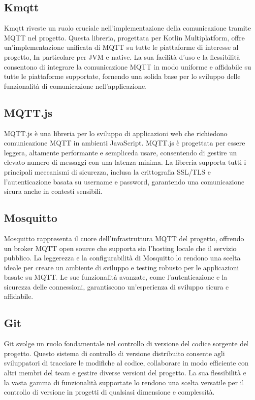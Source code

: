 \documentclass[12pt,a4paper,openright,twoside]{book}
\begin{document}
\subsection{Kmqtt}
Kmqtt riveste un ruolo cruciale nell'implementazione della comunicazione tramite \ac{MQTT} nel progetto. Questa libreria, progettata per Kotlin Multiplatform, offre 
un'implementazione unificata di \ac{MQTT} su tutte le piattaforme di interesse al progetto, In particolare per \ac{JVM} e native. La sua facilità d'uso e la flessibilità consentono di integrare la comunicazione 
\ac{MQTT} in modo uniforme e affidabile su tutte le piattaforme supportate, fornendo una solida base per lo sviluppo delle funzionalità di comunicazione nell'applicazione.

\subsection{MQTT.js}
MQTT.js è una libreria per lo sviluppo di applicazioni web che richiedono comunicazione \ac{MQTT} in ambienti JavaScript. 
MQTT.js è progettata per essere leggera, altamente performante e sempliceda usare, consentendo di gestire un elevato numero di messaggi con una latenza minima. 
La libreria supporta tutti i principali meccanismi di sicurezza, inclusa la crittografia SSL/TLS e l'autenticazione basata su username e password, garantendo una comunicazione 
sicura anche in contesti sensibili.
\pagebreak
\subsection{Mosquitto}

Mosquitto rappresenta il cuore dell'infrastruttura \ac{MQTT} del progetto, offrendo un broker \ac{MQTT} open source che supporta sia l'hosting locale che il servizio pubblico. 
La leggerezza e la configurabilità di Mosquitto lo rendono una scelta ideale per creare un ambiente di sviluppo e testing robusto per le applicazioni basate su \ac{MQTT}. 
Le sue funzionalità avanzate, come l'autenticazione e la sicurezza delle connessioni, garantiscono un'esperienza di sviluppo sicura e affidabile.

\subsection{Git}
Git svolge un ruolo fondamentale nel controllo di versione del codice sorgente del progetto. Questo sistema di controllo di versione distribuito consente agli sviluppatori 
di tracciare le modifiche al codice, collaborare in modo efficiente con altri membri del team e gestire diverse versioni del progetto. La sua flessibilità e la vasta gamma 
di funzionalità supportate lo rendono una scelta versatile per il controllo di versione in progetti di qualsiasi dimensione e complessità.
\end{document}
